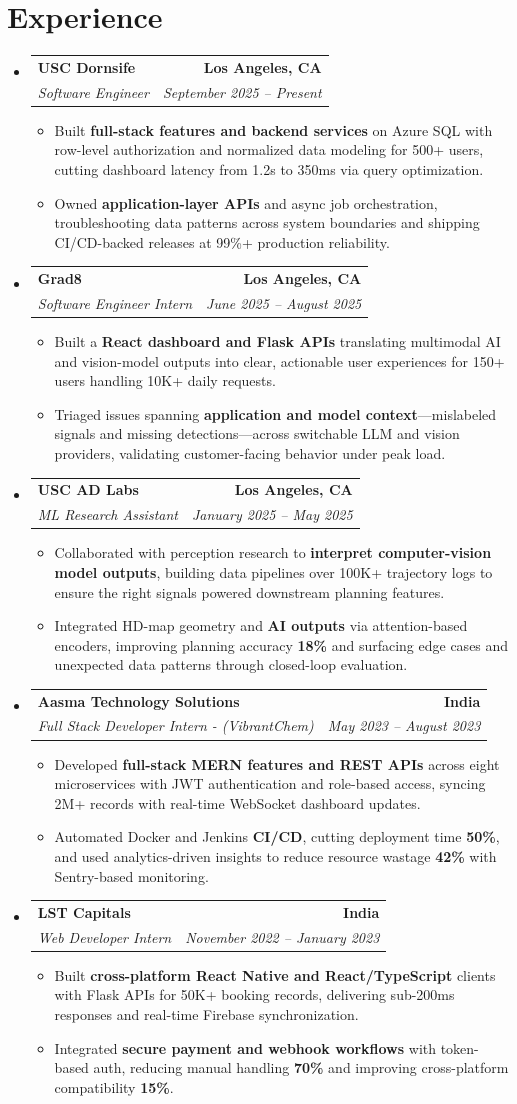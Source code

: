 \documentclass[letterpaper,10pt]{article}
\makeatletter
\newcommand{\resumeItem}[1]{\item\small{{#1 \vspace{-2pt}}}}
\newcommand{\resumeSubheading}[4]{\vspace{-1pt}\item\begin{tabular*}{1.0\textwidth}[t]{l@{\extracolsep{\fill}}r}\textbf{#1} & \textbf{\small #2} \\\textit{\small#3} & \textit{\small #4} \\\end{tabular*}\vspace{-2pt}}
\newcommand{\resumeSubHeadingListStart}{\begin{itemize}[leftmargin=0.0in, label={}]}
\newcommand{\resumeSubHeadingListEnd}{\end{itemize}}
\newcommand{\resumeItemListStart}{\begin{itemize}[leftmargin=0.15in,label=\textbullet,itemsep=2pt,topsep=0pt,parsep=0pt,partopsep=0pt]}
\newcommand{\resumeItemListEnd}{\end{itemize}\vspace{-4pt}}
\makeatother
\begin{document}
\section{Experience}
\resumeSubHeadingListStart
\resumeSubheading{USC Dornsife}{Los Angeles, CA}{Software Engineer}{September 2025 -- Present}
\resumeItemListStart
\resumeItem{Built \textbf{full-stack features and backend services} on Azure SQL with row-level authorization and normalized data modeling for 500+ users, cutting dashboard latency from 1.2s to 350ms via query optimization.}
\resumeItem{Owned \textbf{application-layer APIs} and async job orchestration, troubleshooting data patterns across system boundaries and shipping CI/CD-backed releases at 99\%+ production reliability.}
\resumeItemListEnd
\resumeSubheading{Grad8}{Los Angeles, CA}{Software Engineer Intern}{June 2025 -- August 2025}
\resumeItemListStart
\resumeItem{Built a \textbf{React dashboard and Flask APIs} translating multimodal AI and vision-model outputs into clear, actionable user experiences for 150+ users handling 10K+ daily requests.}
\resumeItem{Triaged issues spanning \textbf{application and model context}---mislabeled signals and missing detections---across switchable LLM and vision providers, validating customer-facing behavior under peak load.}
\resumeItemListEnd
\resumeSubheading{USC AD Labs}{Los Angeles, CA}{ML Research Assistant}{January 2025 -- May 2025}
\resumeItemListStart
\resumeItem{Collaborated with perception research to \textbf{interpret computer-vision model outputs}, building data pipelines over 100K+ trajectory logs to ensure the right signals powered downstream planning features.}
\resumeItem{Integrated HD-map geometry and \textbf{AI outputs} via attention-based encoders, improving planning accuracy \textbf{18\%} and surfacing edge cases and unexpected data patterns through closed-loop evaluation.}
\resumeItemListEnd
\resumeSubheading{Aasma Technology Solutions}{India}{Full Stack Developer Intern - (VibrantChem)}{May 2023 -- August 2023}
\resumeItemListStart
\resumeItem{Developed \textbf{full-stack MERN features and REST APIs} across eight microservices with JWT authentication and role-based access, syncing 2M+ records with real-time WebSocket dashboard updates.}
\resumeItem{Automated Docker and Jenkins \textbf{CI/CD}, cutting deployment time \textbf{50\%}, and used analytics-driven insights to reduce resource wastage \textbf{42\%} with Sentry-based monitoring.}
\resumeItemListEnd
\resumeSubheading{LST Capitals}{India}{Web Developer Intern}{November 2022 -- January 2023}
\resumeItemListStart
\resumeItem{Built \textbf{cross-platform React Native and React/TypeScript} clients with Flask APIs for 50K+ booking records, delivering sub-200ms responses and real-time Firebase synchronization.}
\resumeItem{Integrated \textbf{secure payment and webhook workflows} with token-based auth, reducing manual handling \textbf{70\%} and improving cross-platform compatibility \textbf{15\%}.}
\resumeItemListEnd
\resumeSubHeadingListEnd
\vspace{-6pt}
\end{document}
